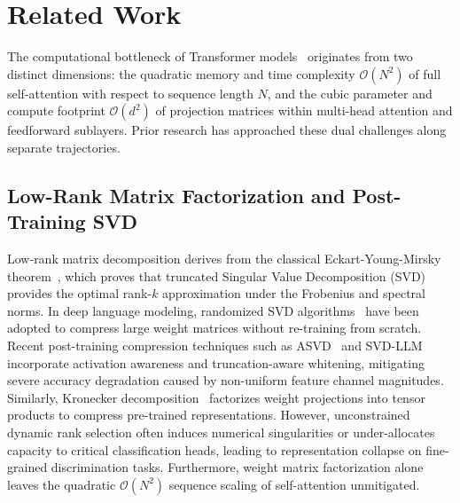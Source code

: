 \section{Related Work}
\label{sec:related_work}

The computational bottleneck of Transformer models~\cite{vaswani2017attention} originates from two distinct dimensions: the quadratic memory and time complexity $\mathcal{O}(N^2)$ of full self-attention with respect to sequence length $N$, and the cubic parameter and compute footprint $\mathcal{O}(d^2)$ of projection matrices within multi-head attention and feedforward sublayers. Prior research has approached these dual challenges along separate trajectories.

\subsection{Low-Rank Matrix Factorization and Post-Training SVD}
Low-rank matrix decomposition derives from the classical Eckart-Young-Mirsky theorem~\cite{eckart1936approximation}, which proves that truncated Singular Value Decomposition (SVD) provides the optimal rank-$k$ approximation under the Frobenius and spectral norms. In deep language modeling, randomized SVD algorithms~\cite{halko2011structure} have been adopted to compress large weight matrices without re-training from scratch. Recent post-training compression techniques such as ASVD~\cite{yuan2023asvd} and SVD-LLM~\cite{wang2024svdllm} incorporate activation awareness and truncation-aware whitening, mitigating severe accuracy degradation caused by non-uniform feature channel magnitudes. Similarly, Kronecker decomposition~\cite{edalati2022kronecker} factorizes weight projections into tensor products to compress pre-trained representations. However, unconstrained dynamic rank selection often induces numerical singularities or under-allocates capacity to critical classification heads, leading to representation collapse on fine-grained discrimination tasks. Furthermore, weight matrix factorization alone leaves the quadratic $\mathcal{O}(N^2)$ sequence scaling of self-attention unmitigated.

